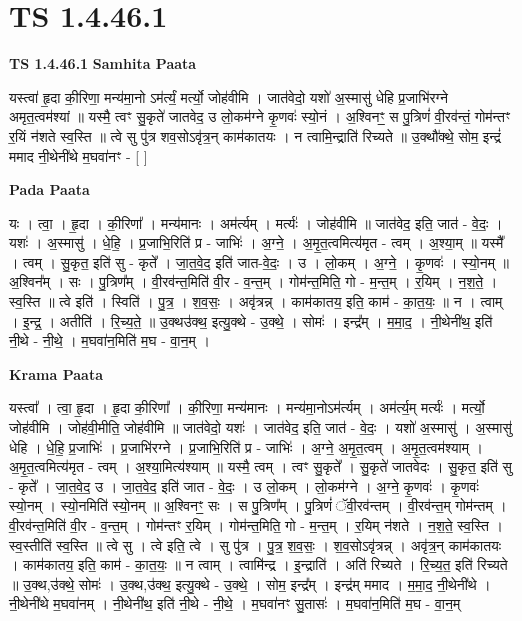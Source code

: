 \documentclass[17pt]{extarticle}
\begin{document}
\section{ TS 1.4.46.1 }

\textbf{TS 1.4.46.1 } \newline
\textbf{Samhita Paata} \newline

यस्त्वा॑ हृ॒दा की॒रिणा॒ मन्य॑मा॒नो ऽम॑र्त्यं॒ मर्त्यो॒ जोह॑वीमि । जात॑वेदो॒ यशो॑ अ॒स्मासु॑ धेहि प्र॒जाभि॑रग्ने अमृत॒त्वम॑श्यां ॥ यस्मै॒ त्वꣳ सु॒कृते॑ जातवेद॒ उ लो॒कम॑ग्ने कृ॒णवः॑ स्यो॒नं । अ॒श्विनꣳ॒॒ स पु॒त्रिणं॑ वी॒रव॑न्तं॒ गोम॑न्तꣳ र॒यिं न॑शते स्व॒स्ति ॥ त्वे सु पु॑त्र शव॒सोऽवृ॑त्र॒न् काम॑कातयः । न त्वामि॒न्द्राति॑ रिच्यते ॥ उ॒क्थौ॑क्थे॒ सोम॒ इन्द्रं॑ ममाद नी॒थेनी॑थे म॒घवा॑नꣳ - [ ] \newline

\textbf{Pada Paata} \newline

यः । त्वा॒ । हृ॒दा । की॒रिणा᳚ । मन्य॑मानः । अम॑र्त्यम् । मर्त्यः॑ । जोह॑वीमि ॥ जात॑वेद॒ इति॒ जात॑ - वे॒दः॒ । यशः॑ । अ॒स्मासु॑ । धे॒हि॒ । प्र॒जाभि॒रिति॑ प्र - जाभिः॑ । अ॒ग्ने॒ । अ॒मृ॒त॒त्वमित्य॑मृत - त्वम् । अ॒श्या॒म् ॥ यस्मै᳚ । त्वम् । सु॒कृत॒ इति॑ सु - कृते᳚ । जा॒त॒वे॒द॒ इति॑ जात-वे॒दः॒ । उ । लो॒कम् । अ॒ग्ने॒ । कृ॒णवः॑ । स्यो॒नम् ॥ अ॒श्विन᳚म् । सः । पु॒त्रिण᳚म् । वी॒रव॑न्त॒मिति॑ वी॒र - व॒न्त॒म् । गोम॑न्त॒मिति॒ गो - म॒न्त॒म् । र॒यिम् । न॒श॒ते॒ । स्व॒स्ति ॥ त्वे इति॑ । स्विति॑ । पु॒त्र॒ । श॒व॒सः॒ । अवृ॑त्रन्न् । काम॑कातय॒ इति॒ काम॑ - का॒त॒यः॒ ॥ न । त्वाम् । इ॒न्द्र॒ । अतीति॑ । रि॒च्य॒ते॒ ॥ उ॒क्थ‌उ॑क्थ॒ इत्यु॒क्थे - उ॒क्थे॒ । सोमः॑ । इन्द्र᳚म् । म॒मा॒द॒ । नी॒थेनी॑थ॒ इति॑ नी॒थे - नी॒थे॒ । म॒घवा॑न॒मिति॑ म॒घ - वा॒न॒म् ।  \newline


\textbf{Krama Paata} \newline

यस्त्वा᳚ । त्वा॒ हृ॒दा । हृ॒दा की॒रिणा᳚ । की॒रिणा॒ मन्य॑मानः । मन्य॑मा॒नोऽम॑र्त्यम् । अम॑र्त्य॒म् मर्त्यः॑ । मर्त्यो॒ जोह॑वीमि । जोह॑वी॒मीति॒ जोह॑वीमि ॥ जात॑वेदो॒ यशः॑ । जात॑वेद॒ इति॒ जात॑ - वे॒दः॒ । यशो॑ अ॒स्मासु॑ । अ॒स्मासु॑ धेहि । धे॒हि॒ प्र॒जाभिः॑ । प्र॒जाभि॑रग्ने । प्र॒जाभि॒रिति॑ प्र - जाभिः॑ । अ॒ग्ने॒ अ॒मृ॒त॒त्वम् । अ॒मृ॒त॒त्वम॑श्याम् । अ॒मृ॒त॒त्वमित्य॑मृत - त्वम् । अ॒श्या॒मित्य॑श्याम् ॥ यस्मै॒ त्वम् । त्वꣳ सु॒कृते᳚ । सु॒कृते॑ जातवेदः । सु॒कृत॒ इति॑ सु - कृते᳚ । जा॒त॒वे॒द॒ उ । जा॒त॒वे॒द॒ इति॑ जात - वे॒दः॒ । उ लो॒कम् । लो॒कम॑ग्ने । अ॒ग्ने॒ कृ॒णवः॑ । कृ॒णवः॑ स्यो॒नम् । स्यो॒नमिति॑ स्यो॒नम् ॥ अ॒श्विनꣳ॒॒ सः । स पु॒त्रिण᳚म् । पु॒त्रिणं॑ ॅवी॒रव॑न्तम् । वी॒रव॑न्त॒म् गोम॑न्तम् । वी॒रव॑न्त॒मिति॑ वी॒र - व॒न्त॒म् । गोम॑न्तꣳ र॒यिम् । गोम॑न्त॒मिति॒ गो - म॒न्त॒म् । र॒यिम् न॑शते । न॒श॒ते॒ स्व॒स्ति । स्व॒स्तीति॑ स्व॒स्ति ॥ त्वे सु । त्वे इति॒ त्वे । सु पु॑त्र । पु॒त्र॒ श॒व॒सः॒ । श॒व॒सोऽवृ॑त्रन्न् । अवृ॑त्र॒न् काम॑कातयः । काम॑कातय॒ इति॒ काम॑ - का॒त॒यः॒ ॥ न त्वाम् । त्वामि॑न्द्र । इ॒न्द्राति॑ । अति॑ रिच्यते । रि॒च्य॒त॒ इति॑ रिच्यते ॥ उ॒क्थ,उ॑क्थे॒ सोमः॑ । उ॒क्थ,उ॑क्थ॒ इत्यु॒क्थे - उ॒क्थे॒ । सोम॒ इन्द्र᳚म् । इन्द्र॑म् ममाद । म॒मा॒द॒ नी॒थेनी॑थे । नी॒थेनी॑थे म॒घवा॑नम् । नी॒थेनी॑थ॒ इति॑ नी॒थे - नी॒थे॒ । म॒घवा॑नꣳ सु॒तासः॑ । म॒घवा॑न॒मिति॑ म॒घ - वा॒न॒म् \newline
\end{document}
